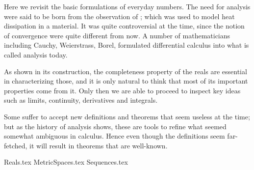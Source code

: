  \label{chap:PMA}

Here we revisit the basic formulations of everyday numbers.
The need for analysis were said to be born
from the observation of ;
which was used to model heat dissipation in a material.
It was quite controversial at the time,
since the notion of convergence were quite different from now.
A number of mathematicians including
Cauchy,
Weierstrass,
Borel,
formulated differential calculus into what is called analysis today.

As shown in its construction,
the completeness property of the reals are essential
in characterizing those,
and it is only natural to think that
most of its important properties come from it.
Only then we are able to proceed to inspect key ideas such as
limits,
continuity,
derivatives and integrals.

Some suffer to accept new definitions and theorems
that seem useless at the time;
but as the history of analysis shows,
these are tools to refine what seemed somewhat ambiguous in calculus.
Hence even though the definitions seem far-fetched,
it will result in theorems that are well-known.

{Reals.tex}
{MetricSpaces.tex}
{Sequences.tex}
